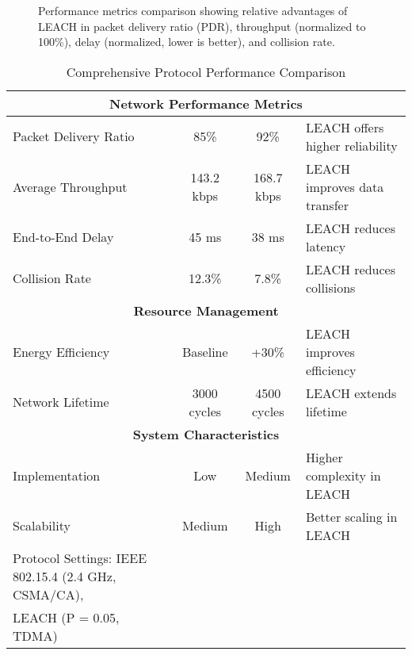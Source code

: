 \documentclass[conference]{IEEEtran}
\begin{document}
\begin{figure}[h!]
\centering
{}
\caption{Performance metrics comparison showing relative advantages of LEACH in packet delivery ratio (PDR), throughput (normalized to 100\%), delay (normalized, lower is better), and collision rate.}
\label{fig:performance_comparison}
\end{figure}

\begin{table}[h!]
\caption{Comprehensive Protocol Performance Comparison}
\label{table:performance_summary}
\renewcommand{\arraystretch}{1.2}
\centering
\begin{tabular}{|l|c|c|l|}
\hline
\multicolumn{4}{|c|}{\textbf{Network Performance Metrics}} \\
\hline
Packet Delivery Ratio & 85\% & 92\% & LEACH offers higher reliability \\
\hline
Average Throughput & 143.2 kbps & 168.7 kbps & LEACH improves data transfer \\
\hline
End-to-End Delay & 45 ms & 38 ms & LEACH reduces latency \\
\hline
Collision Rate & 12.3\% & 7.8\% & LEACH reduces collisions \\
\hline
\multicolumn{4}{|c|}{\textbf{Resource Management}} \\
\hline
Energy Efficiency & Baseline & +30\% & LEACH improves efficiency \\
\hline
Network Lifetime & 3000 cycles & 4500 cycles & LEACH extends lifetime \\
\hline
\multicolumn{4}{|c|}{\textbf{System Characteristics}} \\
\hline
Implementation & Low & Medium & Higher complexity in LEACH \\
\hline
Scalability & Medium & High & Better scaling in LEACH \\
\hline
Protocol Settings: IEEE 802.15.4 (2.4 GHz, CSMA/CA), \\
LEACH (P = 0.05, TDMA) \\
\end{tabular}
\end{table}
\end{document}
